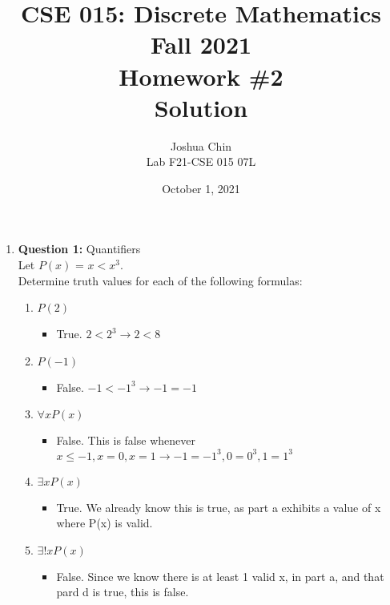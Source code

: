 \documentclass[11pt]{article}
\begin{document}
\author{Joshua Chin\\
Lab F21-CSE 015 07L}

\title{CSE 015: Discrete Mathematics\\
Fall 2021\\
Homework \#2\\
Solution}

\date{October 1, 2021}
\maketitle

\begin{enumerate}

\item
\textbf{Question 1:} Quantifiers \\
Let $P(x)$ = $x < x^3 $. \\
Determine truth values for each of the following formulas: 
\begin{enumerate}[label=(\alph*)]
\item 
$P(2)$ 
\begin{itemize}
    \item 
    True. $2 < 2^3 \rightarrow 2 < 8$
\end{itemize} 
\item 
$P(-1)$
\begin{itemize}
    \item 
    False. $-1 < -1^3 \rightarrow -1 = -1$
\end{itemize}  
\item 
$\forall xP(x)$ 
\begin{itemize}
    \item 
    False. This is false whenever $x \leq  -1, x = 0, x = 1 \rightarrow -1 = -1^3,  0 = 0^3,  1 = 1^3$
\end{itemize} 
\item 
$\exists xP(x)$ 
\begin{itemize}
    \item 
    True. We already know this is true, as part a exhibits a value of x where P(x) is valid.
\end{itemize} 
\item 
$\exists !xP(x)$ 
\begin{itemize}
    \item 
    False. Since we know there is at least 1 valid x, in part a, and that pard d is true, this is false.
\end{itemize} 
\end{enumerate}


\end{enumerate}
\end{document}
